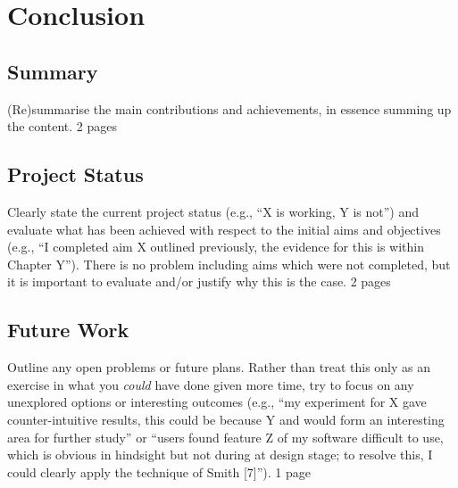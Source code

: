 \documentclass[ %
author={Dillon Keith Diep},
supervisor={Dr. Carl Henrik Ek},
degree={MEng},
title={ART-CG:},
subtitle={Assisted Real-time Content Generation of 3D Hair by Learning Manifolds},
type={Research},
year={2017} ]{dissertation}
\begin{document}
\chapter{Conclusion}
\label{chap:conclusion}

\section{Summary}
(Re)summarise the main contributions and achievements, in essence
summing up the content. 2 pages

\section{Project Status}
Clearly state the current project status (e.g., ``X is working, Y 
is not'') and evaluate what has been achieved with respect to the 
initial aims and objectives (e.g., ``I completed aim X outlined 
previously, the evidence for this is within Chapter Y'').  There 
is no problem including aims which were not completed, but it is 
important to evaluate and/or justify why this is the case. 2 pages

\section{Future Work}
Outline any open problems or future plans.  Rather than treat this
only as an exercise in what you {\em could} have done given more 
time, try to focus on any unexplored options or interesting outcomes
(e.g., ``my experiment for X gave counter-intuitive results, this 
could be because Y and would form an interesting area for further 
study'' or ``users found feature Z of my software difficult to use,
which is obvious in hindsight but not during at design stage; to 
resolve this, I could clearly apply the technique of Smith [7]''). 1 page




%
%
\end{document}
